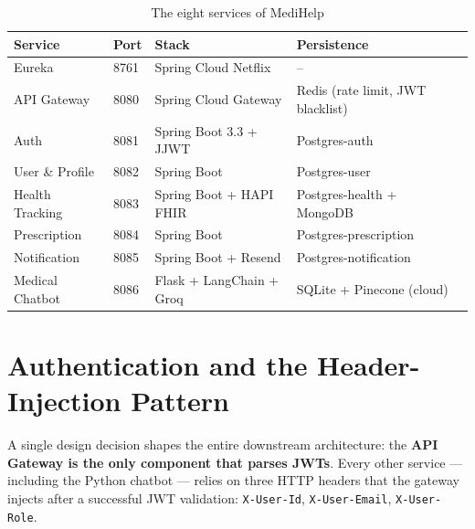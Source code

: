 \documentclass[12pt]{caltech_thesis}
\begin{document}
\begin{table}[H]
    \centering
    \caption{The eight services of MediHelp}
    \label{tab:services}
    \begin{tabular}{lllll}
        \toprule
        Service & Port & Stack & Persistence \\
        \midrule
        Eureka                 & 8761 & Spring Cloud Netflix          & --                                  \\
        API Gateway            & 8080 & Spring Cloud Gateway           & Redis (rate limit, JWT blacklist)   \\
        Auth                   & 8081 & Spring Boot 3.3 + JJWT         & Postgres-auth                       \\
        User \& Profile        & 8082 & Spring Boot                    & Postgres-user                       \\
        Health Tracking        & 8083 & Spring Boot + HAPI FHIR        & Postgres-health + MongoDB           \\
        Prescription           & 8084 & Spring Boot                    & Postgres-prescription               \\
        Notification           & 8085 & Spring Boot + Resend           & Postgres-notification               \\
        Medical Chatbot        & 8086 & Flask + LangChain + Groq       & SQLite + Pinecone (cloud)           \\
        \bottomrule
    \end{tabular}
\end{table}

\section{Authentication and the Header-Injection Pattern}
\label{sec:auth}

A single design decision shapes the entire downstream architecture: the
\textbf{API Gateway is the only component that parses JWTs}. Every other
service --- including the Python chatbot --- relies on three HTTP headers
that the gateway injects after a successful JWT validation:
\texttt{X-User-Id}, \texttt{X-User-Email}, \texttt{X-User-Role}.
\end{document}
